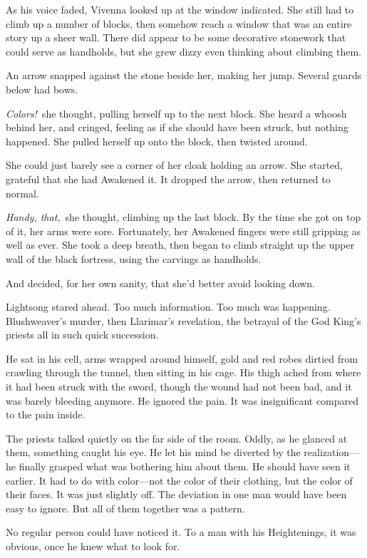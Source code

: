 As his voice faded, Vivenna looked up at the window indicated. She still had to climb up a number of blocks, then somehow reach a window that was an entire story up a sheer wall. There did appear to be some decorative stonework that could serve as handholds, but she grew dizzy even thinking about climbing them.

An arrow snapped against the stone beside her, making her jump. Several guards below had bows.

\textit{Colors!}~she thought, pulling herself up to the next block. She heard a whoosh behind her, and cringed, feeling as if she should have been struck, but nothing happened. She pulled herself up onto the block, then twisted around.

She could just barely see a corner of her cloak holding an arrow. She started, grateful that she had Awakened it. It dropped the arrow, then returned to normal.

\textit{Handy, that,}~she thought, climbing up the last block. By the time she got on top of it, her arms were sore. Fortunately, her Awakened fingers were still gripping as well as ever. She took a deep breath, then began to climb straight up the upper wall of the black fortress, using the carvings as handholds.

And decided, for her own sanity, that she’d better avoid looking down.

\orn

Lightsong stared ahead. Too much information. Too much was happening. Blushweaver’s murder, then Llarimar’s revelation, the betrayal of the God King’s priests all in such quick succession.

He sat in his cell, arms wrapped around himself, gold and red robes dirtied from crawling through the tunnel, then sitting in his cage. His thigh ached from where it had been struck with the sword, though the wound had not been bad, and it was barely bleeding anymore. He ignored the pain. It was insignificant compared to the pain inside.

The priests talked quietly on the far side of the room. Oddly, as he glanced at them, something caught his eye. He let his mind be diverted by the realization—he finally grasped what was bothering him about them. He should have seen it earlier. It had to do with color—not the color of their clothing, but the color of their faces. It was just slightly off. The deviation in one man would have been easy to ignore. But all of them together was a pattern.

No regular person could have noticed it. To a man with his Heightenings, it was obvious, once he knew what to look for.


